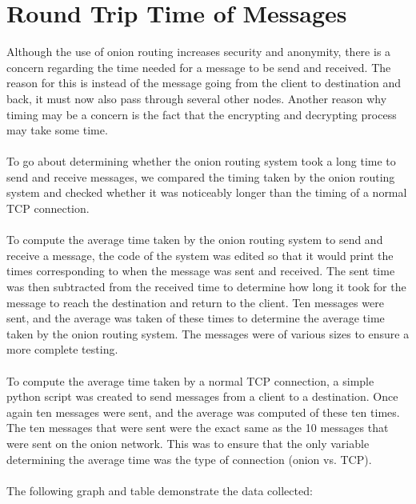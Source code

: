 \documentclass[10pt]{report}
\begin{document}
\section{Round Trip Time of Messages}
Although the use of onion routing increases security and anonymity, there is a concern regarding the time needed for a message to be send and received. The reason for this is instead of the message going from the client to destination and back, it must now also pass through several other nodes. Another reason why timing may be a concern is the fact that the encrypting and decrypting process may take some time.\\\\
To go about determining whether the onion routing system took a long time to send and receive messages, we compared the timing taken by the onion routing system and checked whether it was noticeably longer than the timing of a normal TCP connection.\\\\
To compute the average time taken by the onion routing system to send and receive a message, the code of the system was edited so that it would print the times corresponding to when the message was sent and received. The sent time was then subtracted from the received time to determine how long it took for the message to reach the destination and return to the client. Ten messages were sent, and the average was taken of these times to determine the average time taken by the onion routing system. The messages were of various sizes to ensure a more complete testing.\\\\
To compute the average time taken by a normal TCP connection, a simple python script was created to send messages from a client to a destination. Once again ten messages were sent, and the average was computed of these ten times. The ten messages that were sent were the exact same as the 10 messages that were sent on the onion network. This was to ensure that the only variable determining the average time was the type of connection (onion vs. TCP).\\\\
The following graph and table demonstrate the data collected:
\end{document}
